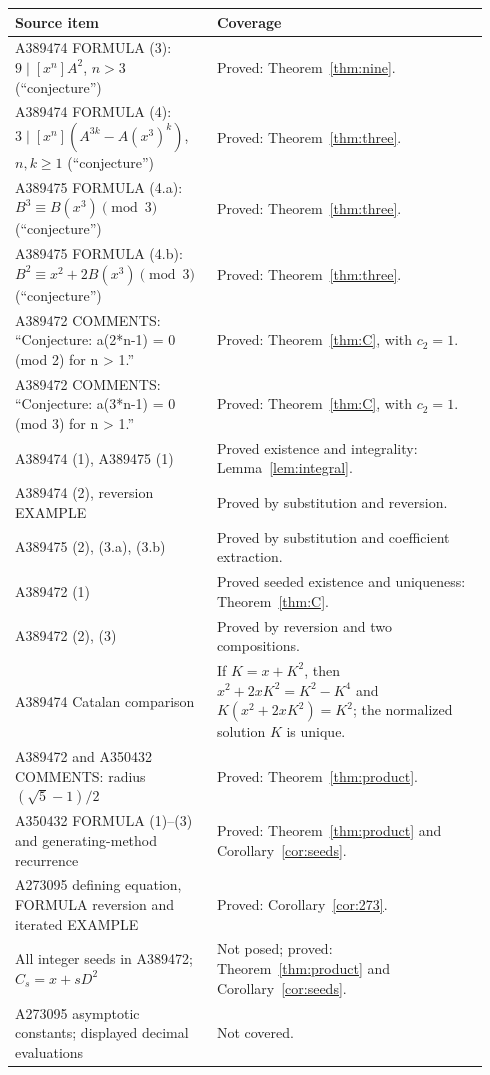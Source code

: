 \documentclass[11pt]{article}
\begin{document}
\begingroup\small\raggedright
\begin{longtable}{@{}>{\raggedright\arraybackslash}p{0.39\linewidth}>{\raggedright\arraybackslash}p{0.55\linewidth}@{}}
\toprule
Source item & Coverage\\
\midrule
A389474 FORMULA (3): $9\mid[x^n]A^2$, $n>3$ (``conjecture'') &
Proved: Theorem~\ref{thm:nine}.\\
A389474 FORMULA (4): $3\mid[x^n](A^{3k}-A(x^3)^k)$,
$n,k\ge1$ (``conjecture'') & Proved: Theorem~\ref{thm:three}.\\
A389475 FORMULA (4.a): $B^3\equiv B(x^3)\pmod3$ (``conjecture'') &
Proved: Theorem~\ref{thm:three}.\\
A389475 FORMULA (4.b): $B^2\equiv x^2+2B(x^3)\pmod3$
(``conjecture'') & Proved: Theorem~\ref{thm:three}.\\
A389472 COMMENTS: ``Conjecture: a(2*n-1) = 0 (mod 2) for n > 1.'' &
Proved: Theorem~\ref{thm:C}, with $c_2=1$.\\
A389472 COMMENTS: ``Conjecture: a(3*n-1) = 0 (mod 3) for n > 1.'' &
Proved: Theorem~\ref{thm:C}, with $c_2=1$.\\
A389474 (1), A389475 (1) & Proved existence and integrality:
Lemma~\ref{lem:integral}.\\
A389474 (2), reversion EXAMPLE & Proved by substitution and reversion.\\
A389475 (2), (3.a), (3.b) & Proved by substitution and coefficient extraction.\\
A389472 (1) & Proved seeded existence and uniqueness:
Theorem~\ref{thm:C}.\\
A389472 (2), (3) & Proved by reversion and two compositions.\\
A389474 Catalan comparison & If $K=x+K^2$, then
$x^2+2xK^2=K^2-K^4$ and $K(x^2+2xK^2)=K^2$;
the normalized solution $K$ is unique.\\
A389472 and A350432 COMMENTS: radius $(\sqrt5-1)/2$ &
Proved: Theorem~\ref{thm:product}.\\
A350432 FORMULA (1)--(3) and generating-method recurrence &
Proved: Theorem~\ref{thm:product} and Corollary~\ref{cor:seeds}.\\
A273095 defining equation, FORMULA reversion and iterated EXAMPLE &
Proved: Corollary~\ref{cor:273}.\\
All integer seeds in A389472; $C_s=x+sD^2$ &
Not posed; proved: Theorem~\ref{thm:product} and
Corollary~\ref{cor:seeds}.\\
A273095 asymptotic constants; displayed decimal evaluations &
Not covered.\\
\bottomrule
\end{longtable}
\endgroup
\end{document}
